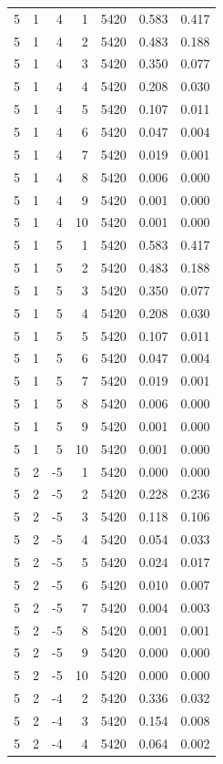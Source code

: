 \begin{table}
\begin{tabular}{rrrrrrr}
5 & 1 & 4 & 1 & 5420 & 0.583 & 0.417 \\
5 & 1 & 4 & 2 & 5420 & 0.483 & 0.188 \\
5 & 1 & 4 & 3 & 5420 & 0.350 & 0.077 \\
5 & 1 & 4 & 4 & 5420 & 0.208 & 0.030 \\
5 & 1 & 4 & 5 & 5420 & 0.107 & 0.011 \\
5 & 1 & 4 & 6 & 5420 & 0.047 & 0.004 \\
5 & 1 & 4 & 7 & 5420 & 0.019 & 0.001 \\
5 & 1 & 4 & 8 & 5420 & 0.006 & 0.000 \\
5 & 1 & 4 & 9 & 5420 & 0.001 & 0.000 \\
5 & 1 & 4 & 10 & 5420 & 0.001 & 0.000 \\
5 & 1 & 5 & 1 & 5420 & 0.583 & 0.417 \\
5 & 1 & 5 & 2 & 5420 & 0.483 & 0.188 \\
5 & 1 & 5 & 3 & 5420 & 0.350 & 0.077 \\
5 & 1 & 5 & 4 & 5420 & 0.208 & 0.030 \\
5 & 1 & 5 & 5 & 5420 & 0.107 & 0.011 \\
5 & 1 & 5 & 6 & 5420 & 0.047 & 0.004 \\
5 & 1 & 5 & 7 & 5420 & 0.019 & 0.001 \\
5 & 1 & 5 & 8 & 5420 & 0.006 & 0.000 \\
5 & 1 & 5 & 9 & 5420 & 0.001 & 0.000 \\
5 & 1 & 5 & 10 & 5420 & 0.001 & 0.000 \\
5 & 2 & -5 & 1 & 5420 & 0.000 & 0.000 \\
5 & 2 & -5 & 2 & 5420 & 0.228 & 0.236 \\
5 & 2 & -5 & 3 & 5420 & 0.118 & 0.106 \\
5 & 2 & -5 & 4 & 5420 & 0.054 & 0.033 \\
5 & 2 & -5 & 5 & 5420 & 0.024 & 0.017 \\
5 & 2 & -5 & 6 & 5420 & 0.010 & 0.007 \\
5 & 2 & -5 & 7 & 5420 & 0.004 & 0.003 \\
5 & 2 & -5 & 8 & 5420 & 0.001 & 0.001 \\
5 & 2 & -5 & 9 & 5420 & 0.000 & 0.000 \\
5 & 2 & -5 & 10 & 5420 & 0.000 & 0.000 \\
5 & 2 & -4 & 2 & 5420 & 0.336 & 0.032 \\
5 & 2 & -4 & 3 & 5420 & 0.154 & 0.008 \\
5 & 2 & -4 & 4 & 5420 & 0.064 & 0.002 \\

\end{tabular}
\end{table}
